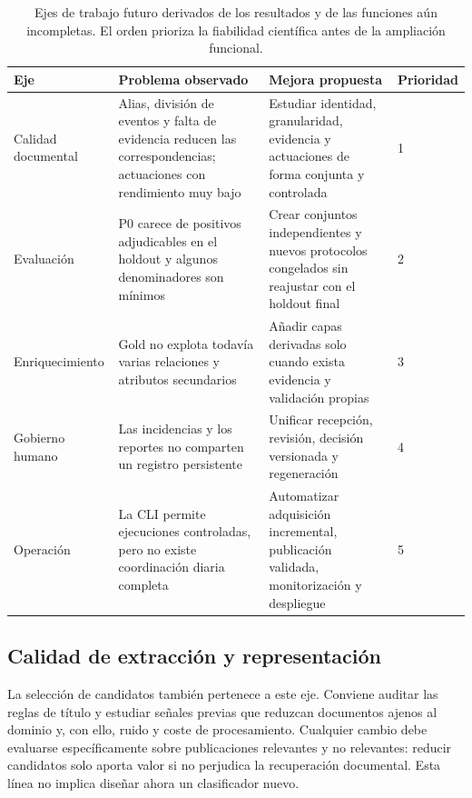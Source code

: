 \begin{table}[htbp]
\centering
\small
\renewcommand{\arraystretch}{1.18}
\begin{tabular}{L{2.5cm} L{3.9cm} L{4.4cm} L{1.6cm}}
\hline
Eje & Problema observado & Mejora propuesta & Prioridad \\
\hline
Calidad documental & Alias, división de eventos y falta de evidencia reducen las correspondencias; actuaciones con rendimiento muy bajo & Estudiar identidad, granularidad, evidencia y actuaciones de forma conjunta y controlada & 1 \\
Evaluación & P0 carece de positivos adjudicables en el holdout y algunos denominadores son mínimos & Crear conjuntos independientes y nuevos protocolos congelados sin reajustar con el holdout final & 2 \\
Enriquecimiento & Gold no explota todavía varias relaciones y atributos secundarios & Añadir capas derivadas solo cuando exista evidencia y validación propias & 3 \\
Gobierno humano & Las incidencias y los reportes no comparten un registro persistente & Unificar recepción, revisión, decisión versionada y regeneración & 4 \\
Operación & La CLI permite ejecuciones controladas, pero no existe coordinación diaria completa & Automatizar adquisición incremental, publicación validada, monitorización y despliegue & 5 \\
\hline
\end{tabular}
\caption[Prioridades de trabajo futuro]{Ejes de trabajo futuro derivados de
los resultados y de las funciones aún incompletas. El orden prioriza la
fiabilidad científica antes de la ampliación funcional.}
\label{tab:trabajo-futuro}
\end{table}

\subsection{Calidad de extracción y representación}

La selección de candidatos también pertenece a este eje. Conviene auditar las
reglas de título y estudiar señales previas que reduzcan documentos ajenos al
dominio y, con ello, ruido y coste de procesamiento. Cualquier cambio debe
evaluarse específicamente sobre publicaciones relevantes y no relevantes:
reducir candidatos solo aporta valor si no perjudica la recuperación
documental. Esta línea no implica diseñar ahora un clasificador nuevo.

